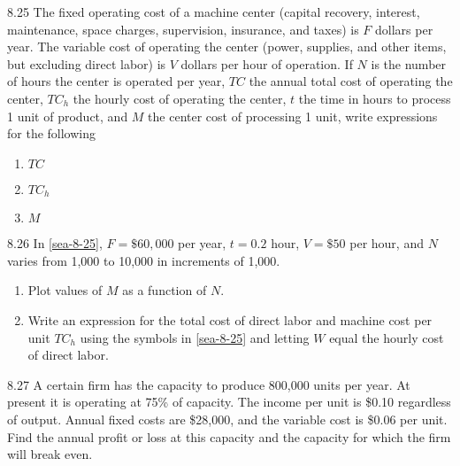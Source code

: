 \begin{exsol@exercise}{8.25}
    \label{sea-8-25}
        The fixed operating cost of a machine center (capital recovery, interest, maintenance, space charges, supervision, insurance, and taxes) is $F$ dollars per year. The variable cost of operating the center (power, supplies, and other items, but excluding direct labor) is $V$ dollars per hour of operation. If $N$ is the number of hours the center is operated per year, $TC$ the annual total cost of operating the center, $TC_h$ the hourly cost of operating the center, $t$ the time in hours to process 1 unit of product, and $M$ the center cost of processing 1 unit, write expressions for the following
        \begin{enumerate}[label=\alph*)]
            \item $TC$
            \item $TC_h$
            \item $M$
        \end{enumerate}
\end{exsol@exercise}
\begin{exsol@solution}{}
\end{exsol@solution}
\begin{exsol@exercise}{8.26}
    \label{sea-8-26}
        In \ref{sea-8-25}, $F=\$60,000$ per year, $t=0.2$ hour, $V=\$50$ per hour, and $N$ varies from 1,000 to 10,000 in increments of 1,000.
        \begin{enumerate}[label=\alph*)]
            \item Plot values of $M$ as a function of $N$.
            \item Write an expression for the total cost of direct labor and machine cost per unit $TC_h$ using the symbols in \ref{sea-8-25} and letting $W$ equal the hourly cost of direct labor.
        \end{enumerate}
\end{exsol@exercise}
\begin{exsol@solution}{}
\end{exsol@solution}
\begin{exsol@exercise}{8.27}
    \label{sea-8-27}
        A certain firm has the capacity to produce 800,000 units per year. At present it is operating at 75\% of capacity. The income per unit is \$0.10 regardless of output. Annual fixed costs are \$28,000, and the variable cost is \$0.06 per unit. Find the annual profit or loss at this capacity and the capacity for which the firm will break even.
\end{exsol@exercise}
